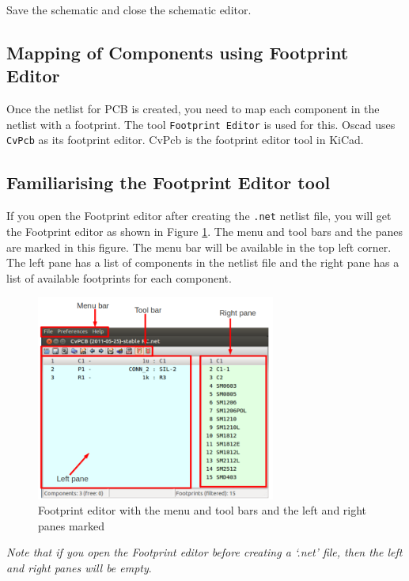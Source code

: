 Save the schematic and close the schematic editor.
\subsection{Mapping of Components using Footprint Editor}
Once the netlist for PCB is created, you need to map each component in the netlist with a footprint. The tool {\tt Footprint Editor} is used for this. Oscad uses {\tt CvPcb} as its footprint editor. CvPcb is the footprint editor tool in KiCad.
\subsection{Familiarising the Footprint Editor tool}
If you open the Footprint editor after creating the {\tt .net} netlist file, you will get the Footprint editor as shown in Figure \ref{fe}. The menu and tool bars and the panes are marked in this figure. The menu bar will be available in the top left corner. The left pane has a list of components in the netlist file and the right pane has a list of available footprints for each component.

\begin{figure}
\centering
\includegraphics[width=0.7\textwidth]{figures/fe}
\caption{Footprint editor with the menu and tool bars and the left and right panes marked}
\label{fe}
\end{figure}
\textit{Note that if you open the Footprint editor before creating a `.net' file, then the left and right panes will be empty}.
